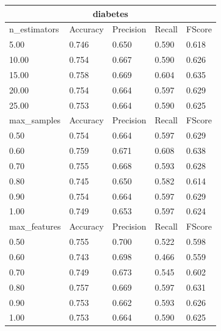 \documentclass[12pt,a4paper]{article}
\begin{document}
\begin{tabular}{ |p{3cm}||p{2cm}|p{2cm}|p{2cm}|p{2cm}| }
\hline
\multicolumn{5}{|c|}{diabetes}\\
\hline
n\_estimators & Accuracy & Precision & Recall & FScore \\
\hline
5.00 & 0.746 & 0.650 & 0.590 & 0.618\\
10.00 & 0.754 & 0.667 & 0.590 & 0.626\\
15.00 & 0.758 & 0.669 & 0.604 & 0.635\\
20.00 & 0.754 & 0.664 & 0.597 & 0.629\\
25.00 & 0.753 & 0.664 & 0.590 & 0.625\\
\hline
max\_samples & Accuracy & Precision & Recall & FScore \\
\hline
0.50 & 0.754 & 0.664 & 0.597 & 0.629\\
0.60 & 0.759 & 0.671 & 0.608 & 0.638\\
0.70 & 0.755 & 0.668 & 0.593 & 0.628\\
0.80 & 0.745 & 0.650 & 0.582 & 0.614\\
0.90 & 0.754 & 0.664 & 0.597 & 0.629\\
1.00 & 0.749 & 0.653 & 0.597 & 0.624\\
\hline
max\_features & Accuracy & Precision & Recall & FScore \\
\hline
0.50 & 0.755 & 0.700 & 0.522 & 0.598\\
0.60 & 0.743 & 0.698 & 0.466 & 0.559\\
0.70 & 0.749 & 0.673 & 0.545 & 0.602\\
0.80 & 0.757 & 0.669 & 0.597 & 0.631\\
0.90 & 0.753 & 0.662 & 0.593 & 0.626\\
1.00 & 0.753 & 0.664 & 0.590 & 0.625\\
\hline
\end{tabular}
\end{document}

